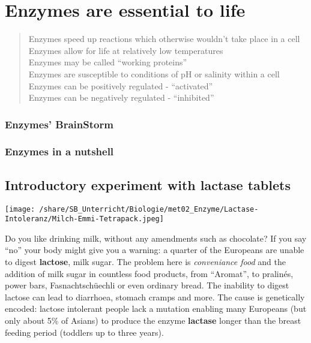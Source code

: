 \section{Enzymes are essential to life}\label{sec:Enzymes}
	\begin{quote}
	Enzymes speed up reactions which otherwise wouldn't take place in a cell \\
	Enzymes allow for life at relatively low temperatures \\ 
	Enzymes may be called "`working proteins"'\\
	Enzymes are susceptible to conditions of pH or salinity within a cell \\
	Enzymes can be positively regulated - "`activated"' \\
	Enzymes can be negatively regulated - "`inhibited"'
	\end{quote}
	
\subsubsection*{Enzymes' BrainStorm}

\subsubsection*{Enzymes in a nutshell}

\clearpage
\subsection{Introductory experiment with lactase tablets}
	\begin{marginfigure}[1cm]%
		\hspace{1cm}  \texttt{[image: /share/SB\_Unterricht/Biologie/met02\_Enzyme/Lactase-Intoleranz/Milch-Emmi-Tetrapack.jpeg]}
	 \end{marginfigure}

Do you like drinking milk, without any amendments such as chocolate? If you say "`no"' your body might give you a warning: a quarter of the Europeans are unable to digest \textbf{lactose}, milk sugar. The problem here is \emph{conveniance food} and the addition of milk sugar in countless food products, from "`Aromat"', to pralinés, power bars, Fasnachtschüechli or even ordinary bread. The inability to digest lactose can lead to diarrhoea, stomach cramps and more. The cause is genetically encoded: lactose intolerant people lack a mutation enabling many Europeans (but only about 5\% of Asians) to produce the enzyme \textbf{lactase} longer than the breast feeding period (toddlers up to three years).



